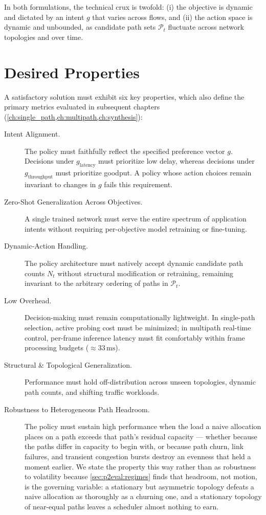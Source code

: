 In both formulations, the technical crux is twofold: (i) the objective is dynamic and dictated by an intent $g$ that varies across flows, and (ii) the action space is dynamic and unbounded, as candidate path sets $\mathcal{P}_t$ fluctuate across network topologies and over time.

\section{Desired Properties}
\label{sec:problem:properties}

A satisfactory solution must exhibit six key properties, which also define the primary metrics evaluated in subsequent chapters (\cref{ch:single_path,ch:multipath,ch:synthesis}):

\begin{description}
  \item[Intent Alignment.] The policy must faithfully reflect the specified preference vector $g$. Decisions under $g_{\mathrm{latency}}$ must prioritize low delay, whereas decisions under $g_{\mathrm{throughput}}$ must prioritize goodput. A policy whose action choices remain invariant to changes in $g$ fails this requirement.
  
  \item[Zero-Shot Generalization Across Objectives.] A single trained network must serve the entire spectrum of application intents without requiring per-objective model retraining or fine-tuning.
  
  \item[Dynamic-Action Handling.] The policy architecture must natively accept dynamic candidate path counts $N_t$ without structural modification or retraining, remaining invariant to the arbitrary ordering of paths in $\mathcal{P}_t$.
  
  \item[Low Overhead.] Decision-making must remain computationally lightweight. In single-path selection, active probing cost must be minimized; in multipath real-time control, per-frame inference latency must fit comfortably within frame processing budgets ($\approx 33\,\mathrm{ms}$).
  
  \item[Structural \& Topological Generalization.] Performance must hold off-distribution across unseen topologies, dynamic path counts, and shifting traffic workloads.
  
  \item[Robustness to Heterogeneous Path Headroom.] The policy must sustain high performance when the
  load a naive allocation places on a path exceeds that path's residual capacity --- whether because
  the paths differ in capacity to begin with, or because path churn, link failures, and transient
  congestion bursts destroy an evenness that held a moment earlier. We state the property this way
  rather than as robustness to volatility because \cref{sec:p2eval:regimes} finds that headroom, not
  motion, is the governing variable: a stationary but asymmetric topology defeats a naive allocation as
  thoroughly as a churning one, and a stationary topology of near-equal paths leaves a scheduler almost
  nothing to earn.
\end{description}

